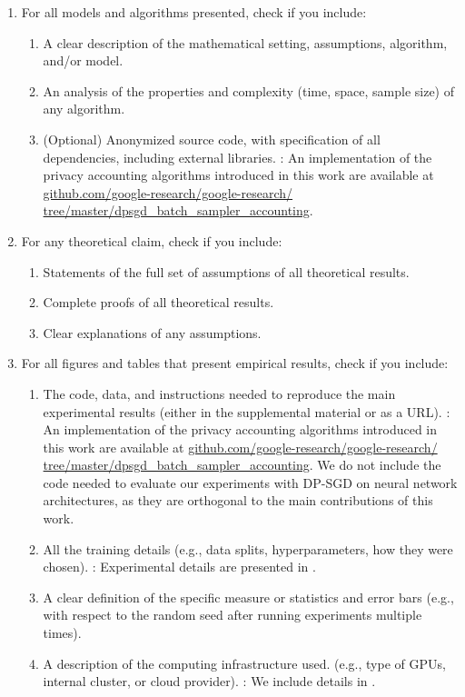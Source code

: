 \documentclass[twoside]{article}
\theoremstyle{definition}
\begin{document}
\begin{enumerate}
\item For all models and algorithms presented, check if you include:
\begin{enumerate}
\item A clear description of the mathematical setting, assumptions, algorithm, and/or model. \YES
\item An analysis of the properties and complexity (time, space, sample size) of any algorithm. \YES
\item (Optional) Anonymized source code, with specification of all dependencies, including external libraries. \YES : An implementation of the privacy accounting algorithms introduced in this work are available at \href{https://github.com/google-research/google-research/tree/master/dpsgd_batch_sampler_accounting}{\small github.com/google-research/google-research/ tree/master/dpsgd\_batch\_sampler\_accounting}.
\end{enumerate}

\item For any theoretical claim, check if you include:
\begin{enumerate}
\item Statements of the full set of assumptions of all theoretical results. \YES
\item Complete proofs of all theoretical results. \YES
\item Clear explanations of any assumptions. \YES
\end{enumerate}

\item For all figures and tables that present empirical results, check if you include:
\begin{enumerate}
\item The code, data, and instructions needed to reproduce the main experimental results (either in the supplemental material or as a URL). \YES : An implementation of the privacy accounting algorithms introduced in this work are available at \href{https://github.com/google-research/google-research/tree/master/dpsgd_batch_sampler_accounting}{\small github.com/google-research/google-research/ tree/master/dpsgd\_batch\_sampler\_accounting}. We do not include the code needed to evaluate our experiments with DP-SGD on neural network architectures, as they are orthogonal to the main contributions of this work.
\item All the training details (e.g., data splits, hyperparameters, how they were chosen). \YES : Experimental details are presented in .
 \item A clear definition of the specific measure or statistics and error bars (e.g., with respect to the random seed after running experiments multiple times). \YES
 \item A description of the computing infrastructure used. (e.g., type of GPUs, internal cluster, or cloud provider). \YES: We include details in .
\end{enumerate}


\end{enumerate}
\end{document}
